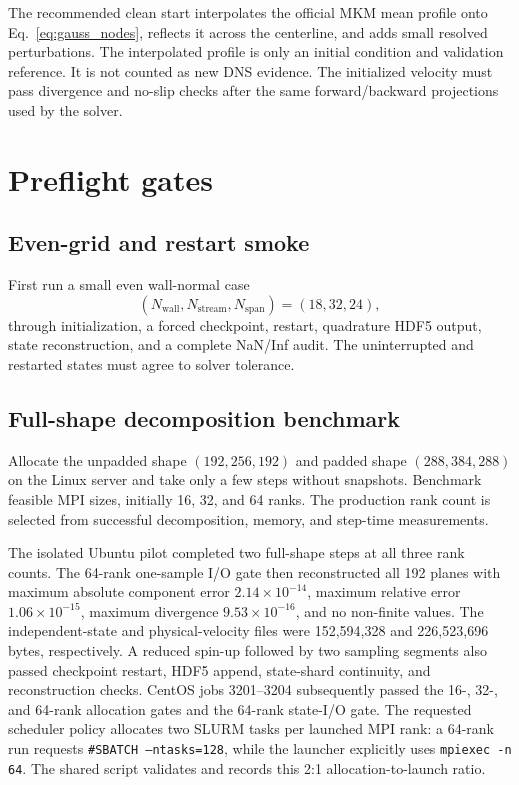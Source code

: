 \documentclass[11pt]{article}
\begin{document}
The recommended clean start interpolates the official MKM mean profile onto
Eq.~\eqref{eq:gauss_nodes}, reflects it across the centerline, and adds small
resolved perturbations.  The interpolated profile is only an initial
condition and validation reference.  It is not counted as new DNS evidence.
The initialized velocity must pass divergence and no-slip checks after the
same forward/backward projections used by the solver.

\section{Preflight gates}
\label{sec:gates}

\subsection{Even-grid and restart smoke}

First run a small even wall-normal case
\[
  (N_{\mathrm{wall}},N_{\mathrm{stream}},N_{\mathrm{span}})
  =(18,32,24),
\]
through initialization, a forced checkpoint, restart, quadrature HDF5 output,
state reconstruction, and a complete NaN/Inf audit.  The uninterrupted and
restarted states must agree to solver tolerance.

\subsection{Full-shape decomposition benchmark}

Allocate the unpadded shape $(192,256,192)$ and padded shape
$(288,384,288)$ on the Linux server and take only a few steps without
snapshots.  Benchmark feasible MPI sizes, initially 16, 32, and 64 ranks.
The production rank count is selected from successful decomposition, memory,
and step-time measurements.

The isolated Ubuntu pilot completed two full-shape steps at all three rank
counts.  The 64-rank one-sample I/O gate then reconstructed all 192 planes
with maximum absolute component error $2.14\times10^{-14}$, maximum relative
error $1.06\times10^{-15}$, maximum divergence $9.53\times10^{-16}$, and no
non-finite values.  The independent-state and physical-velocity files were
152,594,328 and 226,523,696 bytes, respectively.  A reduced spin-up followed
by two sampling segments also passed checkpoint restart, HDF5 append,
state-shard continuity, and reconstruction checks.  CentOS jobs 3201--3204
subsequently passed the 16-, 32-, and 64-rank allocation gates and the
64-rank state-I/O gate.  The requested scheduler policy allocates two SLURM
tasks per launched MPI rank: a 64-rank run requests
\texttt{\#SBATCH --ntasks=128}, while the launcher explicitly uses
\texttt{mpiexec -n 64}.  The shared script validates and records this 2:1
allocation-to-launch ratio.
\end{document}
